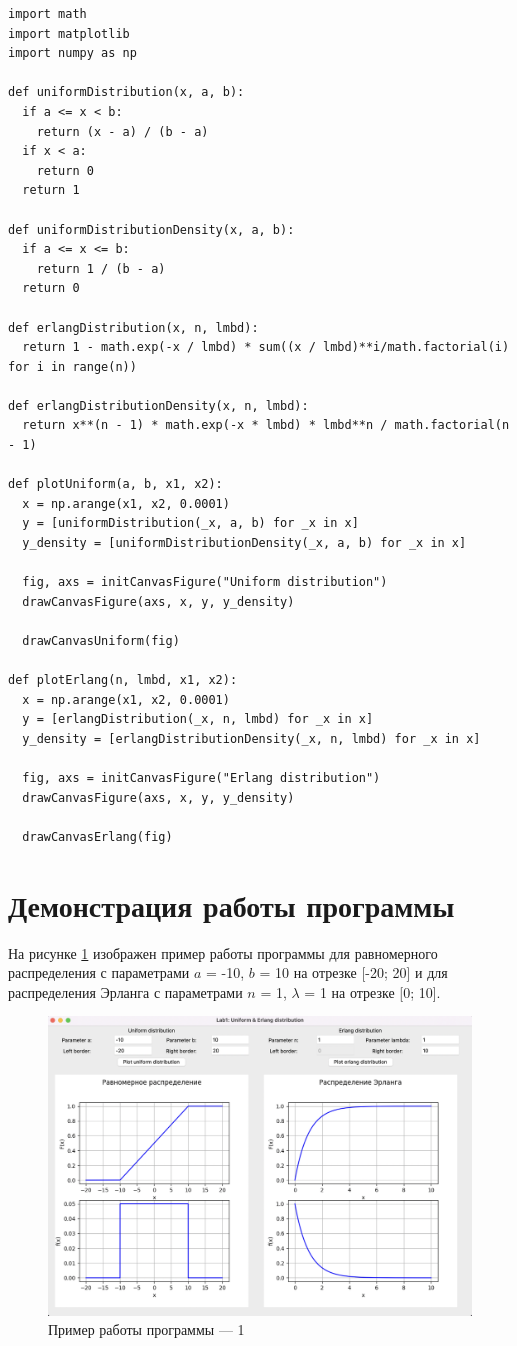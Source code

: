 \documentclass[12pt]{report}
\begin{document}
\begin{lstlisting}
import math
import matplotlib
import numpy as np

def uniformDistribution(x, a, b):
  if a <= x < b:
    return (x - a) / (b - a)
  if x < a:
    return 0
  return 1

def uniformDistributionDensity(x, a, b):
  if a <= x <= b:
    return 1 / (b - a)
  return 0

def erlangDistribution(x, n, lmbd):
  return 1 - math.exp(-x / lmbd) * sum((x / lmbd)**i/math.factorial(i) for i in range(n))

def erlangDistributionDensity(x, n, lmbd):
  return x**(n - 1) * math.exp(-x * lmbd) * lmbd**n / math.factorial(n - 1)

def plotUniform(a, b, x1, x2):
  x = np.arange(x1, x2, 0.0001)
  y = [uniformDistribution(_x, a, b) for _x in x]
  y_density = [uniformDistributionDensity(_x, a, b) for _x in x]

  fig, axs = initCanvasFigure("Uniform distribution")
  drawCanvasFigure(axs, x, y, y_density)

  drawCanvasUniform(fig)

def plotErlang(n, lmbd, x1, x2):
  x = np.arange(x1, x2, 0.0001)
  y = [erlangDistribution(_x, n, lmbd) for _x in x]
  y_density = [erlangDistributionDensity(_x, n, lmbd) for _x in x]

  fig, axs = initCanvasFigure("Erlang distribution")
  drawCanvasFigure(axs, x, y, y_density)

  drawCanvasErlang(fig)
\end{lstlisting}


\section*{Демонстрация работы программы}
На рисунке \ref{fig:pic1} изображен пример работы программы для равномерного распределения с параметрами $a$ = -10, $b$ = 10 на отрезке [-20; 20] и для распределения Эрланга с параметрами $n$ = 1, $\lambda$ = 1 на отрезке [0; 10].

\begin{figure}[h!btp]
	\centering
	\includegraphics[width=1\textwidth]{inc/pic1.png}
	\caption{Пример работы программы --- 1}
	\label{fig:pic1}	
\end{figure}
\end{document}
